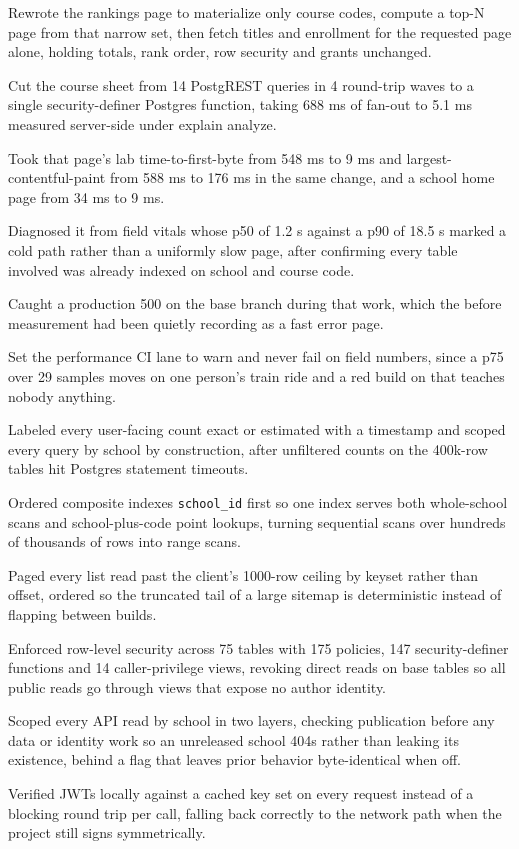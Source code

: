 \documentclass[letterpaper,11pt]{article}
\newcommand{\resumeItem}[1]{
  \item\small{
    {#1 \vspace{-2pt}}
  }
}
\begin{document}
            \resumeItem{Rewrote the rankings page to materialize only course codes, compute a top-N page from that narrow set, then fetch titles and enrollment for the requested page alone, holding totals, rank order, row security and grants unchanged.}
            \resumeItem{Cut the course sheet from 14 PostgREST queries in 4 round-trip waves to a single security-definer Postgres function, taking 688 ms of fan-out to 5.1 ms measured server-side under explain analyze.}
            \resumeItem{Took that page's lab time-to-first-byte from 548 ms to 9 ms and largest-contentful-paint from 588 ms to 176 ms in the same change, and a school home page from 34 ms to 9 ms.}
            \resumeItem{Diagnosed it from field vitals whose p50 of 1.2 s against a p90 of 18.5 s marked a cold path rather than a uniformly slow page, after confirming every table involved was already indexed on school and course code.}
            \resumeItem{Caught a production 500 on the base branch during that work, which the before measurement had been quietly recording as a fast error page.}
            \resumeItem{Set the performance CI lane to warn and never fail on field numbers, since a p75 over 29 samples moves on one person's train ride and a red build on that teaches nobody anything.}
            \resumeItem{Labeled every user-facing count exact or estimated with a timestamp and scoped every query by school by construction, after unfiltered counts on the 400k-row tables hit Postgres statement timeouts.}
            \resumeItem{Ordered composite indexes \texttt{school\_id} first so one index serves both whole-school scans and school-plus-code point lookups, turning sequential scans over hundreds of thousands of rows into range scans.}
            \resumeItem{Paged every list read past the client's 1000-row ceiling by keyset rather than offset, ordered so the truncated tail of a large sitemap is deterministic instead of flapping between builds.}
            \resumeItem{Enforced row-level security across 75 tables with 175 policies, 147 security-definer functions and 14 caller-privilege views, revoking direct reads on base tables so all public reads go through views that expose no author identity.}
            \resumeItem{Scoped every API read by school in two layers, checking publication before any data or identity work so an unreleased school 404s rather than leaking its existence, behind a flag that leaves prior behavior byte-identical when off.}
            \resumeItem{Verified JWTs locally against a cached key set on every request instead of a blocking round trip per call, falling back correctly to the network path when the project still signs symmetrically.}
\end{document}
